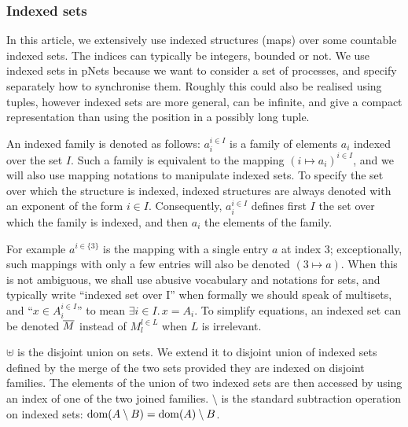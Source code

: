 \documentclass{lmcs}
\begin{document}
\subsubsection*{Indexed sets}



In this article, we extensively use indexed structures
(maps) over some countable indexed sets.   The indices can typically be
integers, bounded or not. We use indexed sets in pNets because we want to consider a set of processes, and specify separately how to synchronise them. Roughly this could also be realised using tuples, however indexed sets are more general, can be infinite, and give a compact representation than using the position in a possibly long tuple.

An indexed family is denoted as
follows: $a_i^{i\in I}$ is a family of elements $a_i$ indexed over the
set $I$. Such a family
is equivalent to the mapping $(i\mapsto a_i)^{i\in I}$, and we will also use mapping 
notations to manipulate indexed sets.
To specify the set over which the structure is indexed, 
indexed structures are always denoted with an exponent of the form $i\in I$.
Consequently, $a_i^{i\in I}$ defines first $I$ the set over which the
family is indexed, and then $a_i$ the elements of the family.

For example $a^{i\in\{3\}}$ is
the mapping with a single entry $a$ at index $3$; exceptionally, such mappings with
only a few entries will also be denoted $(3\mapsto a)$.
When this is not ambiguous, we shall use abusive vocabulary and
notations for sets, and typically write ``indexed set over I'' when  
formally we should speak of multisets, and ``$x\in
A_i^{i\in I}$'' to mean $\exists i\in I.\, x=A_i$.
To simplify equations, an indexed set can be denoted $\overline{M}$
instead of $M_l^{l\in L}$ when $L$ is irrelevant.

$\uplus$ is the disjoint union on sets. We extend it to  disjoint union  of indexed 
sets defined by the merge of the 
two sets provided they are indexed on disjoint families.
The elements
of the union of two indexed sets are then accessed by using an index of one of the two
joined families.
$\setminus$ is the standard subtraction operation on indexed sets: $\operatorname{dom}(A\setminus B)=\operatorname{dom}(A)\setminus B$.
\end{document}
